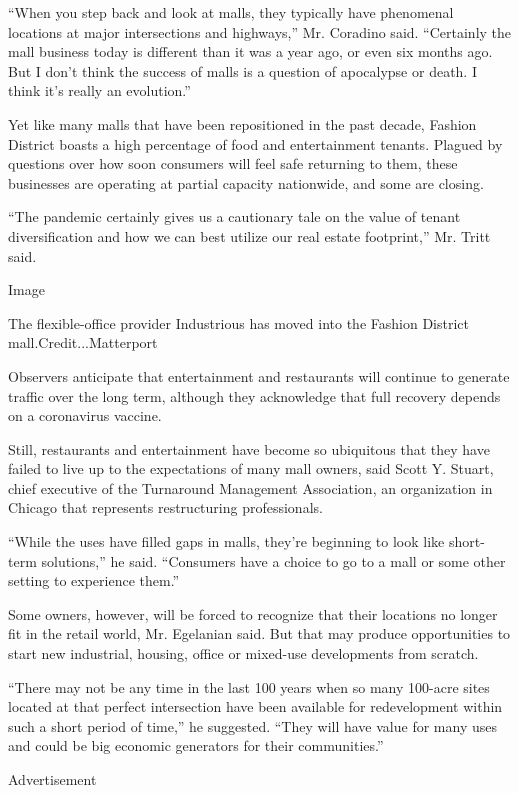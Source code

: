 ``When you step back and look at malls, they typically have phenomenal
locations at major intersections and highways,'' Mr. Coradino said.
``Certainly the mall business today is different than it was a year ago,
or even six months ago. But I don't think the success of malls is a
question of apocalypse or death. I think it's really an evolution.''

Yet like many malls that have been repositioned in the past decade,
Fashion District boasts a high percentage of food and entertainment
tenants. Plagued by questions over how soon consumers will feel safe
returning to them, these businesses are operating at partial capacity
nationwide, and some are closing.

``The pandemic certainly gives us a cautionary tale on the value of
tenant diversification and how we can best utilize our real estate
footprint,'' Mr. Tritt said.

Image

The flexible-office provider Industrious has moved into the Fashion
District mall.Credit...Matterport

Observers anticipate that entertainment and restaurants will continue to
generate traffic over the long term, although they acknowledge that full
recovery depends on a coronavirus vaccine.

Still, restaurants and entertainment have become so ubiquitous that they
have failed to live up to the expectations of many mall owners, said
Scott Y. Stuart, chief executive of the Turnaround Management
Association, an organization in Chicago that represents restructuring
professionals.

``While the uses have filled gaps in malls, they're beginning to look
like short-term solutions,'' he said. ``Consumers have a choice to go to
a mall or some other setting to experience them.''

Some owners, however, will be forced to recognize that their locations
no longer fit in the retail world, Mr. Egelanian said. But that may
produce opportunities to start new industrial, housing, office or
mixed-use developments from scratch.

``There may not be any time in the last 100 years when so many 100-acre
sites located at that perfect intersection have been available for
redevelopment within such a short period of time,'' he suggested. ``They
will have value for many uses and could be big economic generators for
their communities.''

Advertisement

